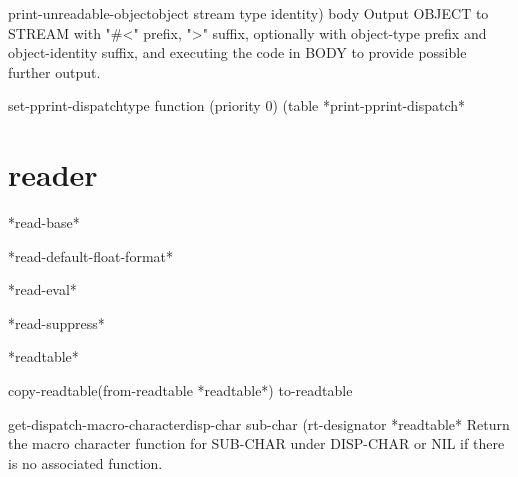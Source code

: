 \begin{macro}{print-unreadable-object}{object stream \key type identity) \body body}{}
  Output OBJECT to STREAM with "#<" prefix, ">" suffix, optionally
  with object-type prefix and object-identity suffix, and executing the
  code in BODY to provide possible further output.
\end{macro}

\begin{function}{set-pprint-dispatch}{type function \op (priority 0) (table *print-pprint-dispatch*}{}
  
\end{function}

\section{reader}

\begin{variable}{*read-base*}{}{}
  
\end{variable}

\begin{variable}{*read-default-float-format*}{}{}
  
\end{variable}

\begin{variable}{*read-eval*}{}{}
  
\end{variable}

\begin{variable}{*read-suppress*}{}{}
  
\end{variable}

\begin{variable}{*readtable*}{}{}
  
\end{variable}

\begin{function}{copy-readtable}{\op (from-readtable *readtable*) to-readtable}{}
  
\end{function}

\begin{function}{get-dispatch-macro-character}{disp-char sub-char \op (rt-designator *readtable*}{}
  Return the macro character function for SUB-CHAR under DISP-CHAR
   or NIL if there is no associated function.
\end{function}


